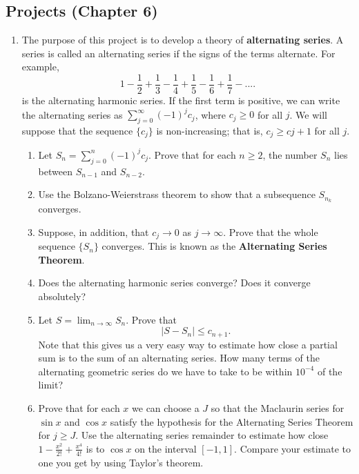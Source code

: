 \documentclass{article}
\begin{document}
\subsection*{Projects (Chapter 6)}

\begin{enumerate}
      \item The purpose of this project is to develop a theory of
            \textbf{alternating series}. A series is called an alternating
            series if the signs of the terms alternate. For example,
            \[
                  1-\frac{1}{2}+\frac{1}{3}-\frac{1}{4}+\frac{1}{5}
                  -\frac{1}{6}+\frac{1}{7}-....
            \]
            is the alternating harmonic series. If the first term is positive,
            we can write the alternating series as $\sum_{j=0}^\infty(-1)^jc_j$,
            where $c_j\geq 0$ for all $j$. We will suppose that the sequence
            $\{c_j\}$ is non-increasing; that is, $c_j\geq c{j+1}$ for all $j$.
            \begin{enumerate}
                  \item Let $S_n=\sum_{j=0}^n(-1)^jc_j$. Prove that for each $n\geq 2$,
                        the number $S_n$ lies between $S_{n-1}$ and $S_{n-2}$.
                  \item  Use the Bolzano-Weierstrass theorem to show that a subsequence
                        $S_{n_k}$ converges.
                  \item Suppose, in addition, that $c_j\to 0$ as $j\to\infty$. Prove that
                        the whole sequence $\{S_n\}$ converges. This is known as the
                        \textbf{Alternating Series Theorem}.
                  \item Does the alternating harmonic series converge? Does it converge
                        absolutely?
                  \item Let $S=\lim_{n\to\infty}S_n$. Prove that
                        \[
                              \lvert S-S_n\rvert \leq c_{n+1}.
                        \]
                        Note that this gives us a very easy way to estimate how close a
                        partial sum is to the sum of an alternating series. How many terms
                        of the alternating geometric series do we have to take to be within
                        $10^{-4}$ of the limit?
                  \item Prove that for each $x$ we can choose a $J$ so that the Maclaurin
                        series for $\sin x$ and $\cos x$ satisfy the hypothesis for the
                        Alternating Series Theorem for $j\geq J$. Use the alternating series
                        remainder to estimate how close $1-\frac{x^2}{2!}+\frac{x^4}{4!}$ is
                        to $\cos x$ on the interval $[-1,1]$. Compare your estimate to one
                        you get by using Taylor's theorem.
            \end{enumerate}
\end{enumerate}
\end{document}
